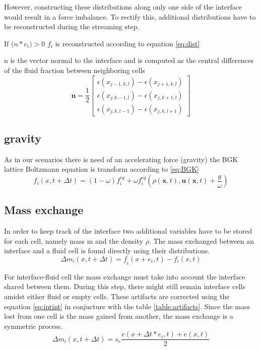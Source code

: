\documentclass[10pt,a4paper,notitlepage]{article}
\begin{document}
However, constructing these distributions along only one side of the interface would result in a force imbalance. To rectify this, additional distributions have to be reconstructed during the streaming step.

If $\mathbf(n*e_{i})>0$
$f_{i}$ is reconstructed according to equation \eqref{eq:dist}

n is the vector normal to the interface and is computed as the central differences of the fluid fraction between neighboring cells
\begin{equation} \label{eq:normal}
\mathbf{n}=\frac{1}{2}\begin{bmatrix} \epsilon(x_{j-1,k,l})-\epsilon(x_{j+1,k,l})\\\epsilon(x_{j,k-1,l})-\epsilon(x_{j,k+1,l})\\\epsilon(x_{j,k,l-1})-\epsilon(x_{j,k,l+1} ) \end{bmatrix}
\end{equation}

\subsection{gravity }
As in our scenarios there is need of an accelerating force (gravity) the BGK lattice Boltzmann equation is transform according to \eqref{eq:BGK}\cite{thurey2006optimization}
\begin{equation} \label{eq:BGK}
f_{i}(x,t+\Delta t)=(1-\omega)f_{i}^{eq}+\omega f_{i}^{eq}(\rho(\mathbf{x},t),\mathbf{u}(\mathbf{x},t)+\frac{g}{\omega})
\end{equation}
\subsection{Mass exchange}
In order to keep track of the interface two additional variables have to be stored for each cell, namely mass m and the density $\rho$. The mass exchanged between an interface and a fluid cell  is found directly using their distributions. 
\begin{equation} \label{eq:fluid-interface}
\Delta m_{i}(x,t+\Delta t)=f_{\hat{i}}(x+e_{i},t)-f_{i}(x,t)
\end{equation}

For interface-fluid cell the mass exchange must take into account the interface shared between them. During this step, there might still remain interface cells amidst either fluid or empty cells. These artifacts are corrected using the equation \eqref{eq:intint} in conjucture with the table \ref{table:artifacts}. Since the mass lost from one cell is the mass gained from another, the mass exchange is a symmetric process.
\begin{equation} \label{eq:intint}
\Delta m_{i}(x,t+\Delta t)=s_{e} \frac{e(x+\Delta t*e_{i},t)+e(x,t)}{2}
\end{equation}
\end{document}
